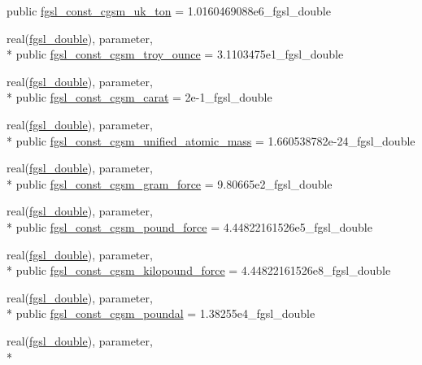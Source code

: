 \begin{DoxyCompactItemize}
public \hyperlink{classfgsl_abcaa9958fedcc17e52fb560e58639633}{fgsl\-\_\-const\-\_\-cgsm\-\_\-uk\-\_\-ton} = 1.\-0160469088e6\-\_\-fgsl\-\_\-double
\item 
real(\hyperlink{classfgsl_a9af5113378e0f000eb479d3f90196ddf}{fgsl\-\_\-double}), parameter, \\*
public \hyperlink{classfgsl_aa2e9facb3d97dfb32697727764bbd619}{fgsl\-\_\-const\-\_\-cgsm\-\_\-troy\-\_\-ounce} = 3.\-1103475e1\-\_\-fgsl\-\_\-double
\item 
real(\hyperlink{classfgsl_a9af5113378e0f000eb479d3f90196ddf}{fgsl\-\_\-double}), parameter, \\*
public \hyperlink{classfgsl_a239136f12feacdcaf3bc528ccb0c492f}{fgsl\-\_\-const\-\_\-cgsm\-\_\-carat} = 2e-\/1\-\_\-fgsl\-\_\-double
\item 
real(\hyperlink{classfgsl_a9af5113378e0f000eb479d3f90196ddf}{fgsl\-\_\-double}), parameter, \\*
public \hyperlink{classfgsl_a6b7f3fbb6b2b1c225cab4719706b6d59}{fgsl\-\_\-const\-\_\-cgsm\-\_\-unified\-\_\-atomic\-\_\-mass} = 1.\-660538782e-\/24\-\_\-fgsl\-\_\-double
\item 
real(\hyperlink{classfgsl_a9af5113378e0f000eb479d3f90196ddf}{fgsl\-\_\-double}), parameter, \\*
public \hyperlink{classfgsl_a1ba32b331b50764a4e448e8020526104}{fgsl\-\_\-const\-\_\-cgsm\-\_\-gram\-\_\-force} = 9.\-80665e2\-\_\-fgsl\-\_\-double
\item 
real(\hyperlink{classfgsl_a9af5113378e0f000eb479d3f90196ddf}{fgsl\-\_\-double}), parameter, \\*
public \hyperlink{classfgsl_a42219a1cda342fbf61675de1c4fa2e9a}{fgsl\-\_\-const\-\_\-cgsm\-\_\-pound\-\_\-force} = 4.\-44822161526e5\-\_\-fgsl\-\_\-double
\item 
real(\hyperlink{classfgsl_a9af5113378e0f000eb479d3f90196ddf}{fgsl\-\_\-double}), parameter, \\*
public \hyperlink{classfgsl_aca0248b47e63c840ed0ab430927008f1}{fgsl\-\_\-const\-\_\-cgsm\-\_\-kilopound\-\_\-force} = 4.\-44822161526e8\-\_\-fgsl\-\_\-double
\item 
real(\hyperlink{classfgsl_a9af5113378e0f000eb479d3f90196ddf}{fgsl\-\_\-double}), parameter, \\*
public \hyperlink{classfgsl_a4453ec263f2b4c5802122e762e1672c4}{fgsl\-\_\-const\-\_\-cgsm\-\_\-poundal} = 1.\-38255e4\-\_\-fgsl\-\_\-double
\item 
real(\hyperlink{classfgsl_a9af5113378e0f000eb479d3f90196ddf}{fgsl\-\_\-double}), parameter, \\*

\end{DoxyCompactItemize}
